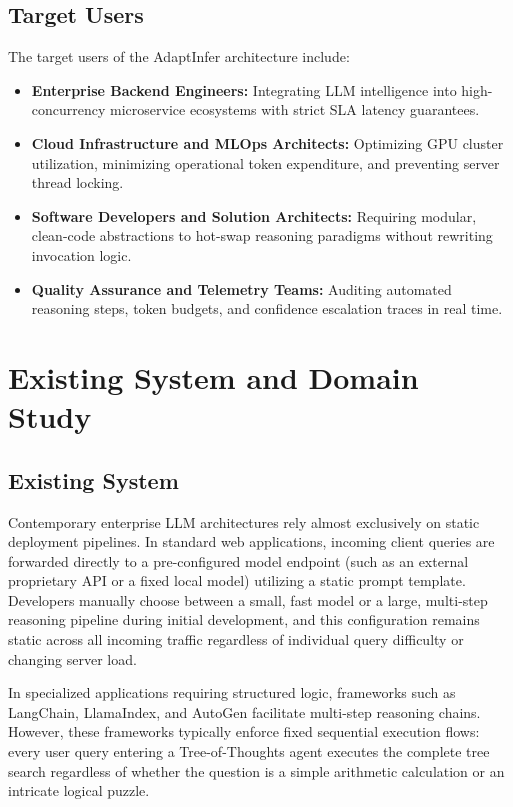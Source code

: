 \documentclass[12pt,a4paper]{report}
\begin{document}
\section{Target Users}
\label{sec:target_users}
The target users of the AdaptInfer architecture include:
\begin{itemize}[leftmargin=*]
    \item \textbf{Enterprise Backend Engineers:} Integrating LLM intelligence into high-concurrency microservice ecosystems with strict SLA latency guarantees.
    \item \textbf{Cloud Infrastructure and MLOps Architects:} Optimizing GPU cluster utilization, minimizing operational token expenditure, and preventing server thread locking.
    \item \textbf{Software Developers and Solution Architects:} Requiring modular, clean-code abstractions to hot-swap reasoning paradigms without rewriting invocation logic.
    \item \textbf{Quality Assurance and Telemetry Teams:} Auditing automated reasoning steps, token budgets, and confidence escalation traces in real time.
\end{itemize}

\chapter{Existing System and Domain Study}
\label{ch:existing_system}

\section{Existing System}
\label{sec:existing_system}
Contemporary enterprise LLM architectures rely almost exclusively on static deployment pipelines. In standard web applications, incoming client queries are forwarded directly to a pre-configured model endpoint (such as an external proprietary API or a fixed local model) utilizing a static prompt template. Developers manually choose between a small, fast model or a large, multi-step reasoning pipeline during initial development, and this configuration remains static across all incoming traffic regardless of individual query difficulty or changing server load.

In specialized applications requiring structured logic, frameworks such as LangChain, LlamaIndex, and AutoGen facilitate multi-step reasoning chains. However, these frameworks typically enforce fixed sequential execution flows: every user query entering a Tree-of-Thoughts agent executes the complete tree search regardless of whether the question is a simple arithmetic calculation or an intricate logical puzzle.
\end{document}
